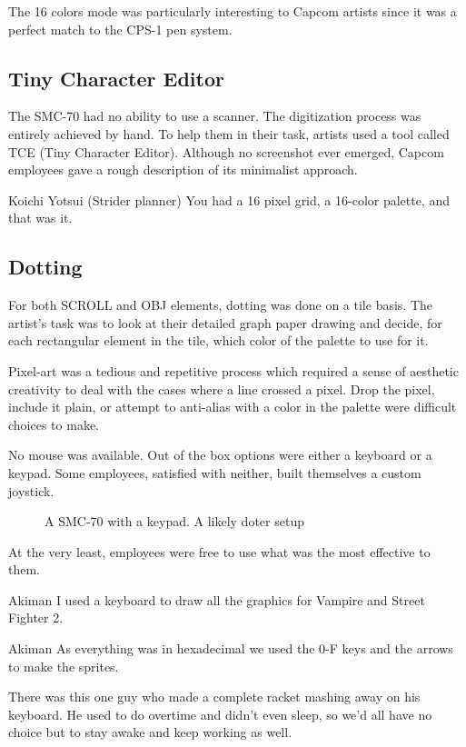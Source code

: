The 16 colors mode was particularly interesting to Capcom artists since it was a perfect match to the CPS-1 pen system.


\subsection{Tiny Character Editor}

The SMC-70 had no ability to use a scanner. The digitization process was entirely achieved by hand. To help them in their task, artists used a tool called TCE (Tiny Character Editor). Although no screenshot ever emerged, Capcom employees gave a rough description of its minimalist approach.

\begin{q}{Koichi Yotsui (Strider planner)}
You had a 16 pixel grid, a 16-color palette, and that was it.
\end{q}


\subsection{Dotting}
For both SCROLL and OBJ elements, dotting was done on a tile basis. The artist's task was to look at their detailed graph paper drawing and decide, for each rectangular element in the tile, which color of the palette to use for it.

Pixel-art was a tedious and repetitive process which required a sense of aesthetic creativity to deal with the cases where a line crossed a pixel. Drop the pixel, include it plain, or attempt to anti-alias with a color in the palette were difficult choices to make.

No mouse was available. Out of the box options were either a keyboard or a keypad. Some employees, satisfied with neither, built themselves a custom joystick.


\begin{figure}[H]
\caption*{A SMC-70 with a keypad. A likely doter setup}
\end{figure}


At the very least, employees were free to use what was the most effective to them.

\begin{q}{Akiman\cite{akiman}}
I used a keyboard to draw all the graphics for Vampire and Street Fighter 2.
\end{q}



\begin{q}{Akiman\cite{ar20160404}}
  As everything was in hexadecimal we used the 0-F keys and the arrows to make the sprites. 

  There was this one guy who made a complete racket mashing away on his keyboard. He used to do overtime and didn't even sleep, so we'd all have no choice but to stay awake and keep working as well.
\end{q}


